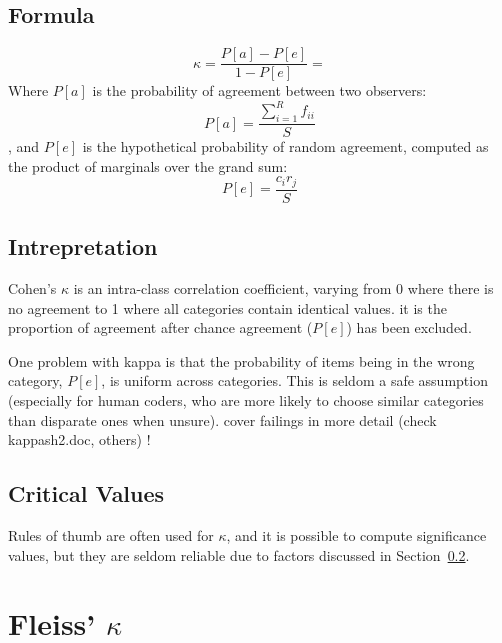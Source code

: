 \documentclass[11pt]{article}
\begin{document}
\subsection{Formula}
$$
\kappa = \frac{P[a] - P[e]}{1-P[e]} =
$$
Where $P[a]$ is the probability of agreement between two observers:
$$
P[a] = \frac{ \sum_{i=1}^{R}f_{ii} }{ S }
$$
, and $P[e]$ is the hypothetical probability of random agreement, computed as the product of marginals over the grand sum:
$$
P[e] = \frac{ c_i r_j }{ S }
$$

\subsection{Intrepretation}
\label{section:cohenkappa:interpretation}
Cohen's $\kappa$ is an intra-class correlation coefficient, varying from 0 where there is no agreement to 1 where all categories contain identical values.  it is the proportion of agreement after chance agreement ($P[e]$) has been excluded. 

One problem with kappa is that the probability of items being in the wrong category, $P[e]$, is uniform across categories.  This is seldom a safe assumption (especially for human coders, who are more likely to choose similar categories than disparate ones when unsure).
{\color{red} cover failings in more detail (check kappash2.doc, others) !}

\subsection{Critical Values}
Rules of thumb are often used for $\kappa$, and it is possible to compute significance values, but they are seldom reliable due to factors discussed in Section~\ref{section:cohenkappa:interpretation}.





\section{Fleiss' $\kappa$} %
\end{document}
